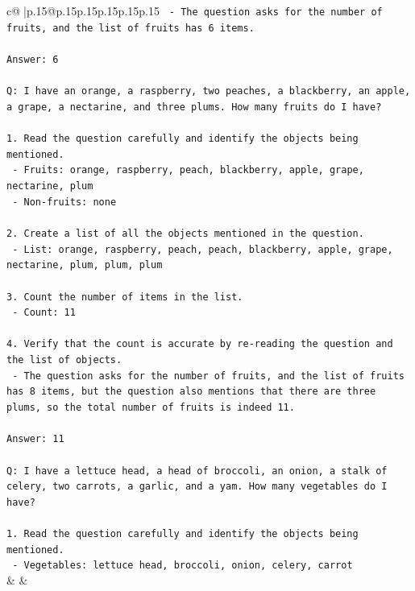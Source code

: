 \documentclass{article}
\begin{document}
{\begin{supertabular}{c@{$\;$}|p{.15\linewidth}@{}p{.15\linewidth}p{.15\linewidth}p{.15\linewidth}p{.15\linewidth}p{.15\linewidth}}
{{{\texttt{   {-} The question asks for the number of fruits, and the list of fruits has 6 items.} \\
\\ 
\texttt{Answer: 6} \\
\\ 
\texttt{Q: I have an orange, a raspberry, two peaches, a blackberry, an apple, a grape, a nectarine, and three plums. How many fruits do I have?} \\
\\ 
\texttt{1. Read the question carefully and identify the objects being mentioned.} \\
\texttt{   {-} Fruits: orange, raspberry, peach, blackberry, apple, grape, nectarine, plum} \\
\texttt{   {-} Non{-}fruits: none} \\
\\ 
\texttt{2. Create a list of all the objects mentioned in the question.} \\
\texttt{   {-} List: orange, raspberry, peach, peach, blackberry, apple, grape, nectarine, plum, plum, plum} \\
\\ 
\texttt{3. Count the number of items in the list.} \\
\texttt{   {-} Count: 11} \\
\\ 
\texttt{4. Verify that the count is accurate by re{-}reading the question and the list of objects.} \\
\texttt{   {-} The question asks for the number of fruits, and the list of fruits has 8 items, but the question also mentions that there are three plums, so the total number of fruits is indeed 11.} \\
\\ 
\texttt{Answer: 11} \\
\\ 
\texttt{Q: I have a lettuce head, a head of broccoli, an onion, a stalk of celery, two carrots, a garlic, and a yam. How many vegetables do I have?} \\
\\ 
\texttt{1. Read the question carefully and identify the objects being mentioned.} \\
\texttt{   {-} Vegetables: lettuce head, broccoli, onion, celery, carrot} \\
            }
        }
    }
    & & \\ \\


\end{supertabular}}
\end{document}
